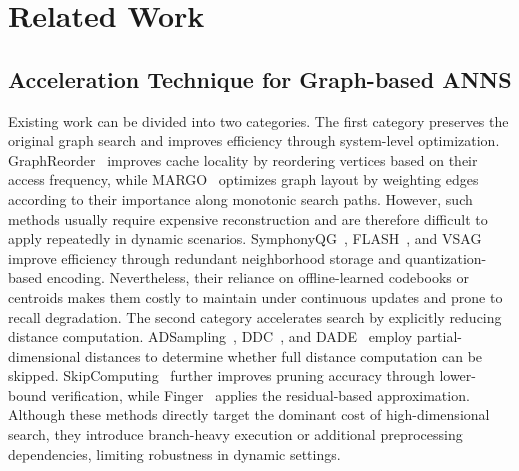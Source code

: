 \section{Related Work}
\subsection{Acceleration Technique for Graph-based ANNS}
Existing work can be divided into two categories. The first category preserves the original graph search and improves efficiency through system-level optimization. GraphReorder~\cite{Coleman202238488} improves cache locality by reordering vertices based on their access frequency, while MARGO~\cite{Yue20254337} optimizes graph layout by weighting edges according to their importance along monotonic search paths. However, such methods usually require expensive reconstruction and are therefore difficult to apply repeatedly in dynamic scenarios. SymphonyQG~\cite{Gou2025}, FLASH~\cite{Wang2025}, and VSAG~\cite{Zhong20255017} improve efficiency through redundant neighborhood storage and quantization-based encoding. Nevertheless, their reliance on offline-learned codebooks or centroids makes them costly to maintain under continuous updates and prone to recall degradation. The second category accelerates search by explicitly reducing distance computation. 
ADSampling~\cite{Gao202327}, DDC~\cite{Yang20251098}, and DADE~\cite{Deng2024812} employ partial-dimensional distances to determine whether full distance computation can be skipped. 
SkipComputing~\cite{Song2025} further improves pruning accuracy through lower-bound verification, while Finger~\cite{Chen20233225} applies the residual-based approximation. Although these methods directly target the dominant cost of high-dimensional search, they introduce branch-heavy execution or additional preprocessing dependencies, limiting robustness in dynamic settings.







